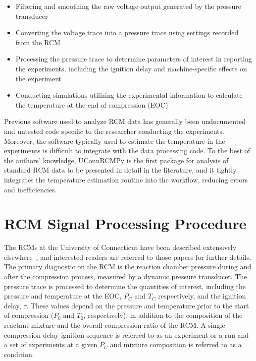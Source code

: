 \documentclass[12pt]{ussci}
\begin{document}
\begin{itemize}
\item
  Filtering and smoothing the raw voltage output generated by the pressure
  transducer
\item
  Converting the voltage trace into a pressure trace using settings
  recorded from the RCM
\item
  Processing the pressure trace to determine parameters of interest in
  reporting the experiments, including the ignition delay and
  machine-specific effects on the experiment
\item
  Conducting simulations utilizing the experimental information to
  calculate the temperature at the end of compression (EOC)
\end{itemize}

Previous software used to analyze RCM data has generally been undocumented and
untested code specific to the researcher conducting the experiments. Moreover,
the software typically used to estimate the temperature in the experiments is
difficult to integrate with the data processing code. To the best of the
authors' knowledge, UConnRCMPy is the first package for analysis of standard RCM
data to be presented in detail in the literature, and it tightly integrates the
temperature estimation routine into the workflow, reducing errors and
inefficiencies.

\section{RCM Signal Processing Procedure}\label{rcm-signal-processing-procedure}

The RCMs at the University of Connecticut have been described extensively
elsewhere~\autocite{Das2012,Mittal2007a}, and interested readers are referred to
those papers for further details. The primary diagnostic on the RCM is the
reaction chamber pressure during and after the compression process, measured by
a dynamic pressure transducer. The pressure trace is processed to determine the
quantities of interest, including the pressure and temperature at the EOC,
\(P_C\) and \(T_C\) respectively, and the ignition delay, \(\tau\). These values
depend on the pressure and temperature prior to the start of compression
(\(P_0\) and \(T_0\), respectively), in addition to the composition of the
reactant mixture and the overall compression ratio of the RCM. A single
compression-delay-ignition sequence is referred to as an experiment or a run and
a set of experiments at a given \(P_C\) and mixture composition is referred to
as a condition.
\end{document}
